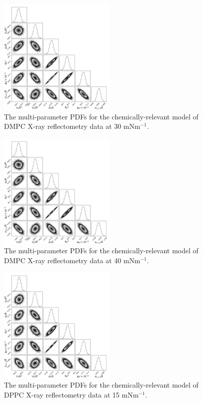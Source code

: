 \documentclass[11pt,a4paper]{paper}
\begin{document}
\begin{figure}[H]
	\centering
	\includegraphics[width=0.50\textwidth]{figures/dmpc3_all_corner}
	\caption{The multi-parameter PDFs for the chemically-relevant model of DMPC X-ray reflectometry data at 30 mNm$^{-1}$.}
	\label{fig:dmpc4}
\end{figure}
\begin{figure}[H]
	\centering
	\includegraphics[width=0.50\textwidth]{figures/dmpc4_all_corner}
	\caption{The multi-parameter PDFs for the chemically-relevant model of DMPC X-ray reflectometry data at 40 mNm$^{-1}$.}
	\label{fig:dmpc5}
\end{figure}
\begin{figure}[H]
	\centering
	\includegraphics[width=0.50\textwidth]{figures/dppc1_all_corner}
	\caption{The multi-parameter PDFs for the chemically-relevant model of DPPC X-ray reflectometry data at 15 mNm$^{-1}$.}
	\label{fig:dppc2}
\end{figure}
\end{document}
